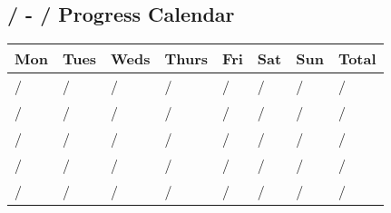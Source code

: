 \documentclass{article}
\begin{document}
\begin{center}
    
    \section*{ \hspace{1cm}/\hspace{1cm} - \hspace{1cm}/\hspace{1cm} Progress Calendar}

        
    {\setlength{\extrarowheight}{30pt}%
        \begin{tabularx}{\textwidth}{|X|X|X|X|X|X|X|X|}
                \hline
                Mon & Tues & Weds & Thurs & Fri & Sat & Sun & Total \\
                \hline\hline
                / & /  & / & / & /  & /  & / & \hspace{0.4cm}/ \\
                \hline
                / & /  & / & / & /  & /  & / & \hspace{0.4cm}/ \\
                \hline
                / & /  & / & / & /  & /  & / & \hspace{0.4cm}/ \\
                \hline
                / & /  & / & / & /  & /  & / & \hspace{0.4cm}/ \\
                \hline
                / & /  & / & / & /  & /  & / & \hspace{0.4cm}/ \\
                \hline
        \end{tabularx}}

    \vspace{0.5cm}
    

\end{center}
\end{document}
